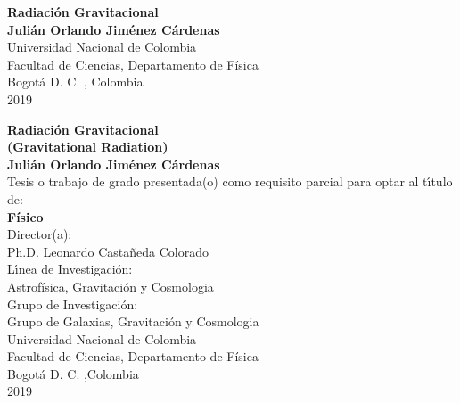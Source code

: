 \begin{center}
\begin{figure}
\centering%
%
\end{figure}
\thispagestyle{empty} \vspace*{2.0cm} \textbf{\huge
Radiaci\'on Gravitacional}\\[6.0cm]
\Large\textbf{Juli\'an Orlando Jim\'enez C\'ardenas}\\[6.0cm]
\small Universidad Nacional de Colombia\\
Facultad de Ciencias, Departamento de F\'isica\\
Bogot\'a D. C. , Colombia\\
2019\\
\end{center}

\newpage{\pagestyle{empty}\cleardoublepage}
\newpage
\begin{center}
\thispagestyle{empty} \vspace*{0cm} \textbf{\huge
Radiaci\'on Gravitacional\\(Gravitational Radiation)}\\[3.0cm]
\Large\textbf{Juli\'an Orlando Jim\'enez C\'ardenas}\\[3.0cm]
\small Tesis o trabajo de grado presentada(o) como requisito parcial para optar al
t\'{\i}tulo de:\\
\textbf{F\'isico}\\[2.5cm]
Director(a):\\
Ph.D. Leonardo Casta\~{n}eda Colorado\\[2.0cm]
L\'{\i}nea de Investigaci\'{o}n: \\
Astrof\'isica, Gravitaci\'on y Cosmologia\\
Grupo de Investigaci\'{o}n:\\
Grupo de Galaxias, Gravitaci\'on y Cosmologia\\[2.5cm]
Universidad Nacional de Colombia\\
Facultad de Ciencias, Departamento de F\'isica\\
Bogot\'a D. C. ,Colombia\\
2019\\
\end{center}

\newpage{\pagestyle{empty}\cleardoublepage}

\newpage
\thispagestyle{empty} \textbf{}\normalsize
\\\\\\%


